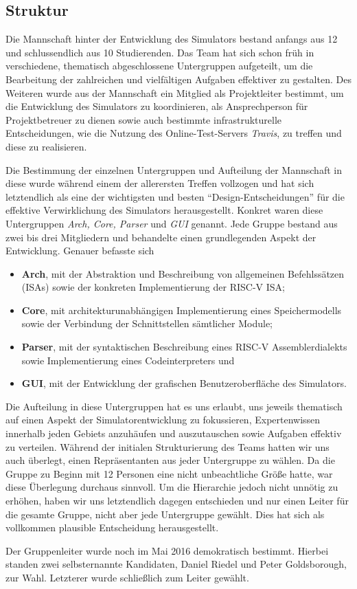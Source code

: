 
\subsection{Struktur}
\label{team:orga-structure}

Die Mannschaft hinter der Entwicklung des \erasim{} Simulators bestand anfangs
aus 12 und schlussendlich aus 10 Studierenden. Das Team hat sich schon früh in
verschiedene, thematisch abgeschlossene Untergruppen aufgeteilt, um die
Bearbeitung der zahlreichen und vielfältigen Aufgaben effektiver zu gestalten.
Des Weiteren wurde aus der Mannschaft ein Mitglied als Projektleiter bestimmt,
um die Entwicklung des Simulators zu koordinieren, als Ansprechperson für
Projektbetreuer zu dienen sowie auch bestimmte infrastrukturelle Entscheidungen,
wie die Nutzung des Online-Test-Servers \emph{Travis}, zu treffen und diese zu
realisieren.

Die Bestimmung der einzelnen Untergruppen und Aufteilung der Mannschaft in diese
wurde während einem der allerersten Treffen vollzogen und hat sich letztendlich
als eine der wichtigsten und besten ``Design-Entscheidungen'' für die effektive
Verwirklichung des Simulators herausgestellt. Konkret waren diese Untergruppen
\emph{Arch, Core, Parser} und \emph{GUI} genannt. Jede Gruppe bestand aus zwei
bis drei Mitgliedern und behandelte einen grundlegenden Aspekt der Entwicklung.
Genauer befasste sich

\begin{itemize}
  \item \textbf{Arch}, mit der Abstraktion und Beschreibung von allgemeinen Befehlssätzen (ISAs) sowie der konkreten Implementierung der RISC-V ISA;
  \item \textbf{Core}, mit architekturunabhängigen Implementierung eines Speichermodells sowie der Verbindung der Schnittstellen sämtlicher Module;
  \item \textbf{Parser}, mit der syntaktischen Beschreibung eines RISC-V Assemblerdialekts sowie Implementierung eines Codeinterpreters und
  \item \textbf{GUI}, mit der Entwicklung der grafischen Benutzeroberfläche des Simulators.
\end{itemize}

Die Aufteilung in diese Untergruppen hat es uns erlaubt, uns jeweils thematisch
auf einen Aspekt der Simulatorentwicklung zu fokussieren, Expertenwissen
innerhalb jeden Gebiets anzuhäufen und auszutauschen sowie Aufgaben effektiv zu
verteilen. Während der initialen Strukturierung des Teams hatten wir uns auch
überlegt, einen Repräsentanten aus jeder Untergruppe zu wählen. Da die Gruppe zu
Beginn mit 12 Personen eine nicht unbeachtliche Größe hatte, war diese
Überlegung durchaus sinnvoll. Um die Hierarchie jedoch nicht unnötig zu erhöhen,
haben wir uns letztendlich dagegen entschieden und nur einen Leiter für die
gesamte Gruppe, nicht aber jede Untergruppe gewählt. Dies hat sich als
vollkommen plausible Entscheidung herausgestellt.

Der Gruppenleiter wurde noch im Mai 2016 demokratisch bestimmt. Hierbei standen
zwei selbsternannte Kandidaten, Daniel Riedel und Peter Goldsborough, zur Wahl.
Letzterer wurde schließlich zum Leiter gewählt.
